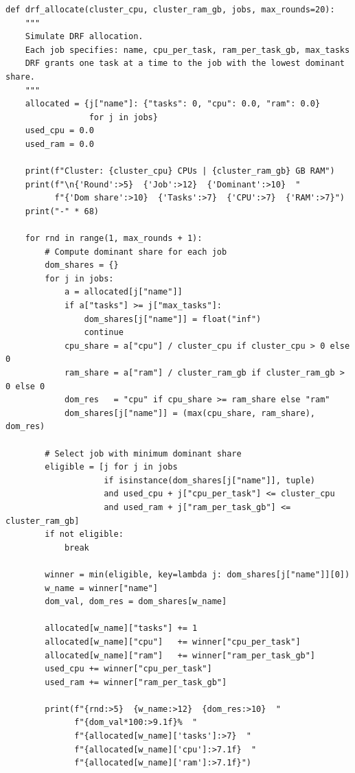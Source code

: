 \begin{lstlisting}[style=pyspark, caption={PE5.3: Dominant Resource Fairness (DRF) simulator}]
def drf_allocate(cluster_cpu, cluster_ram_gb, jobs, max_rounds=20):
    """
    Simulate DRF allocation.
    Each job specifies: name, cpu_per_task, ram_per_task_gb, max_tasks
    DRF grants one task at a time to the job with the lowest dominant share.
    """
    allocated = {j["name"]: {"tasks": 0, "cpu": 0.0, "ram": 0.0}
                 for j in jobs}
    used_cpu = 0.0
    used_ram = 0.0

    print(f"Cluster: {cluster_cpu} CPUs | {cluster_ram_gb} GB RAM")
    print(f"\n{'Round':>5}  {'Job':>12}  {'Dominant':>10}  "
          f"{'Dom share':>10}  {'Tasks':>7}  {'CPU':>7}  {'RAM':>7}")
    print("-" * 68)

    for rnd in range(1, max_rounds + 1):
        # Compute dominant share for each job
        dom_shares = {}
        for j in jobs:
            a = allocated[j["name"]]
            if a["tasks"] >= j["max_tasks"]:
                dom_shares[j["name"]] = float("inf")
                continue
            cpu_share = a["cpu"] / cluster_cpu if cluster_cpu > 0 else 0
            ram_share = a["ram"] / cluster_ram_gb if cluster_ram_gb > 0 else 0
            dom_res   = "cpu" if cpu_share >= ram_share else "ram"
            dom_shares[j["name"]] = (max(cpu_share, ram_share), dom_res)

        # Select job with minimum dominant share
        eligible = [j for j in jobs
                    if isinstance(dom_shares[j["name"]], tuple)
                    and used_cpu + j["cpu_per_task"] <= cluster_cpu
                    and used_ram + j["ram_per_task_gb"] <= cluster_ram_gb]
        if not eligible:
            break

        winner = min(eligible, key=lambda j: dom_shares[j["name"]][0])
        w_name = winner["name"]
        dom_val, dom_res = dom_shares[w_name]

        allocated[w_name]["tasks"] += 1
        allocated[w_name]["cpu"]   += winner["cpu_per_task"]
        allocated[w_name]["ram"]   += winner["ram_per_task_gb"]
        used_cpu += winner["cpu_per_task"]
        used_ram += winner["ram_per_task_gb"]

        print(f"{rnd:>5}  {w_name:>12}  {dom_res:>10}  "
              f"{dom_val*100:>9.1f}%  "
              f"{allocated[w_name]['tasks']:>7}  "
              f"{allocated[w_name]['cpu']:>7.1f}  "
              f"{allocated[w_name]['ram']:>7.1f}")


\end{lstlisting}
